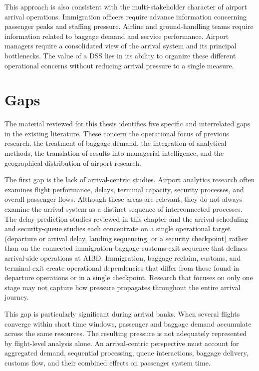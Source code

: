 This approach is also consistent with the multi-stakeholder character of airport arrival operations. Immigration officers require advance information concerning passenger peaks and staffing pressure. Airline and ground-handling teams require information related to baggage demand and service performance. Airport managers require a consolidated view of the arrival system and its principal bottlenecks. The value of a DSS lies in its ability to organize these different operational concerns without reducing arrival pressure to a single measure.

\section{Gaps}
\label{sec:literature-gaps}

The material reviewed for this thesis identifies five specific and interrelated gaps in the existing literature. These concern the operational focus of previous research, the treatment of baggage demand, the integration of analytical methods, the translation of results into managerial intelligence, and the geographical distribution of airport research.

The first gap is the lack of arrival-centric studies. Airport analytics research often examines flight performance, delays, terminal capacity, security processes, and overall passenger flows. Although these areas are relevant, they do not always examine the arrival system as a distinct sequence of interconnected processes. The delay-prediction studies reviewed in this chapter \parencite{shao2019flight,shao2022predicting,zhang2021spatiotemporal,zhu2024spatiotemporal} and the arrival-scheduling and security-queue studies \parencite{pang2024machine,cao2025robust,sang2026integrating} each concentrate on a single operational target (departure or arrival delay, landing sequencing, or a security checkpoint) rather than on the connected immigration-baggage-customs-exit sequence that defines arrival-side operations at AIBD. Immigration, baggage reclaim, customs, and terminal exit create operational dependencies that differ from those found in departure operations or in a single checkpoint. Research that focuses on only one stage may not capture how pressure propagates throughout the entire arrival journey.

This gap is particularly significant during arrival banks. When several flights converge within short time windows, passenger and baggage demand accumulate across the same resources. The resulting pressure is not adequately represented by flight-level analysis alone. An arrival-centric perspective must account for aggregated demand, sequential processing, queue interactions, baggage delivery, customs flow, and their combined effects on passenger system time.


